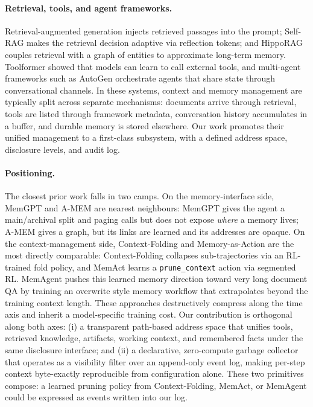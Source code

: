 \paragraph{Retrieval, tools, and agent frameworks.}
Retrieval-augmented generation \citep{lewis2020rag} injects retrieved
passages into the prompt; Self-RAG \citep{asai2024selfrag} makes the
retrieval decision adaptive via reflection tokens; and HippoRAG
\citep{gutierrez2024hipporag} couples retrieval with a graph of
entities to approximate long-term memory. Toolformer
\citep{schick2023toolformer} showed that models can learn to call
external tools, and multi-agent frameworks such as AutoGen
\citep{wu2023autogen} orchestrate agents that share state through
conversational channels. In these systems, context and memory
management are typically split across separate mechanisms: documents
arrive through retrieval, tools are listed through framework metadata,
conversation history accumulates in a buffer, and durable memory is
stored elsewhere. Our work promotes their unified management to a
first-class subsystem, with a defined address space, disclosure levels,
and audit log.

\paragraph{Positioning.} The closest prior work falls in two camps.
On the memory-interface side, MemGPT \citep{packer2023memgpt} and
A-MEM \citep{xu2025amem} are nearest neighbours: MemGPT gives the
agent a main/archival split and paging calls but does not expose
\emph{where} a memory lives; A-MEM gives a graph, but its links are
learned and its addresses are opaque. On the context-management side,
Context-Folding \citep{sun2025contextfolding} and Memory-as-Action
\citep{zhang2025memact} are the most directly comparable:
Context-Folding collapses sub-trajectories via an RL-trained fold
policy, and MemAct learns a \texttt{prune\_context} action via
segmented RL. MemAgent \citep{yu2025memagent} pushes this learned
memory direction toward very long document QA by training an overwrite
style memory workflow that extrapolates beyond the training context
length. These approaches destructively compress along the time axis
and inherit a model-specific training cost. Our contribution is
orthogonal along both axes: (i) a transparent path-based address
space that unifies tools, retrieved knowledge, artifacts, working
context, and remembered facts under the same disclosure interface; and
(ii) a declarative, zero-compute garbage collector that operates as a
visibility filter over an append-only event log, making per-step
context byte-exactly reproducible from configuration alone.
These two primitives compose: a learned pruning policy from
Context-Folding, MemAct, or MemAgent could be expressed as events
written into our log.
